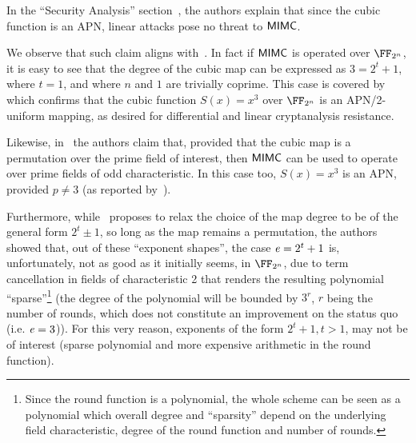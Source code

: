In the ``Security Analysis'' section~\cite[Section 4.2]{albrecht2016mimc}, the authors explain that since the cubic function is an APN, linear attacks pose no threat to $\mathsf{MIMC{}}$.

We observe that such claim aligns with~\cite[Theorem 2]{DBLP:journals/tit/HellesethRS99}. In fact if $\mathsf{MIMC{}}$ is operated over $\FFx{2^n}$, it is easy to see that the degree of the cubic map can be expressed as $3 = 2^t + 1$, where $t = 1$, and where $n$ and $1$ are trivially coprime. This case is covered by~\cite[Theorem 2]{DBLP:journals/tit/HellesethRS99} which confirms that the cubic function $S(x) = x^3$ over $\FFx{2^n}$ is an APN/2-uniform mapping, as desired for differential and linear cryptanalysis resistance.

Likewise, in~\cite[Section 5.1]{albrecht2016mimc} the authors claim that, provided that the cubic map is a permutation over the prime field of interest, then $\mathsf{MIMC{}}$ can be used to operate over prime fields of odd characteristic. In this case too, $S(x) = x^3$ is an APN, provided $p \neq 3$ (as reported by~\cite[Theorem 3, item 3]{DBLP:journals/tit/HellesethRS99}).

Furthermore, while~\cite[Section 5.3]{albrecht2016mimc} proposes to relax the choice of the map degree to be of the general form $2^t \pm 1$, so long as the map remains a permutation, the authors showed that, out of these ``exponent shapes'', the case $\mathit{e}{} = 2^t + 1$ is, unfortunately, not as good as it initially seems, in $\FFx{2^n}$, due to term cancellation in fields of characteristic 2 that renders the resulting polynomial ``sparse''\footnote{Since the round function is a polynomial, the whole scheme can be seen as a polynomial which overall degree and ``sparsity'' depend on the underlying field characteristic, degree of the round function and number of rounds.} (the degree of the polynomial will be bounded by $3^r$, $r$ being the number of rounds, which does not constitute an improvement on the status quo (i.e. $\mathit{e}{} = 3$)). For this very reason, exponents of the form $2^t + 1, t > 1$, may not be of interest (sparse polynomial and more expensive arithmetic in the round function).

